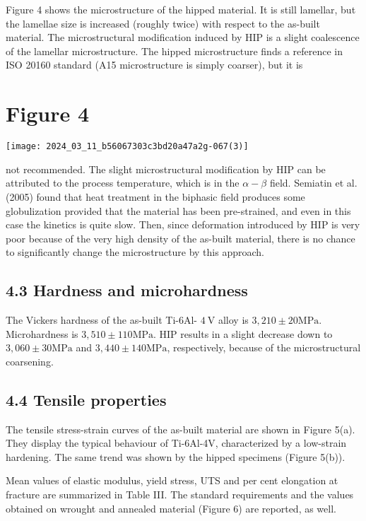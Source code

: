 \documentclass[10pt]{article}
\begin{document}
Figure 4 shows the microstructure of the hipped material. It is still lamellar, but the lamellae size is increased (roughly twice) with respect to the as-built material. The microstructural modification induced by HIP is a slight coalescence of the lamellar microstructure. The hipped microstructure finds a reference in ISO 20160 standard (A15 microstructure is simply coarser), but it is

\section*{Figure 4}
\begin{center}
\texttt{[image: 2024\_03\_11\_b56067303c3bd20a47a2g-067(3)]}
\end{center}

not recommended. The slight microstructural modification by HIP can be attributed to the process temperature, which is in the $\alpha-\beta$ field. Semiatin et al. (2005) found that heat treatment in the biphasic field produces some globulization provided that the material has been pre-strained, and even in this case the kinetics is quite slow. Then, since deformation introduced by HIP is very poor because of the very high density of the as-built material, there is no chance to significantly change the microstructure by this approach.

\subsection*{4.3 Hardness and microhardness}
The Vickers hardness of the as-built Ti-6Al- $4 \mathrm{~V}$ alloy is $3,210 \pm 20 \mathrm{MPa}$. Microhardness is $3,510 \pm 110 \mathrm{MPa}$. HIP results in a slight decrease down to $3,060 \pm 30 \mathrm{MPa}$ and $3,440 \pm 140 \mathrm{MPa}$, respectively, because of the microstructural coarsening.

\subsection*{4.4 Tensile properties}
The tensile stress-strain curves of the as-built material are shown in Figure 5(a). They display the typical behaviour of Ti-6Al-4V, characterized by a low-strain hardening. The same trend was shown by the hipped specimens (Figure 5(b)).

Mean values of elastic modulus, yield stress, UTS and per cent elongation at fracture are summarized in Table III. The standard requirements and the values obtained on wrought and annealed material (Figure 6) are reported, as well.
\end{document}
